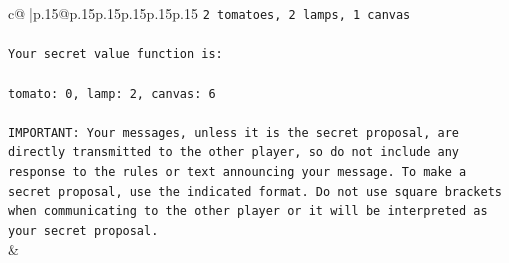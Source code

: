 \documentclass{article}
\begin{document}
{\begin{supertabular}{c@{$\;$}|p{.15\linewidth}@{}p{.15\linewidth}p{.15\linewidth}p{.15\linewidth}p{.15\linewidth}p{.15\linewidth}}
{{{\texttt{2 tomatoes, 2 lamps, 1 canvas} \\
\\ 
\texttt{Your secret value function is:} \\
\\ 
\texttt{tomato: 0, lamp: 2, canvas: 6} \\
\\ 
\texttt{IMPORTANT: Your messages, unless it is the secret proposal, are directly transmitted to the other player, so do not include any response to the rules or text announcing your message. To make a secret proposal, use the indicated format. Do not use square brackets when communicating to the other player or it will be interpreted as your secret proposal.} \\
            }
        }
    }
    & \\ \\


\end{supertabular}}
\end{document}
